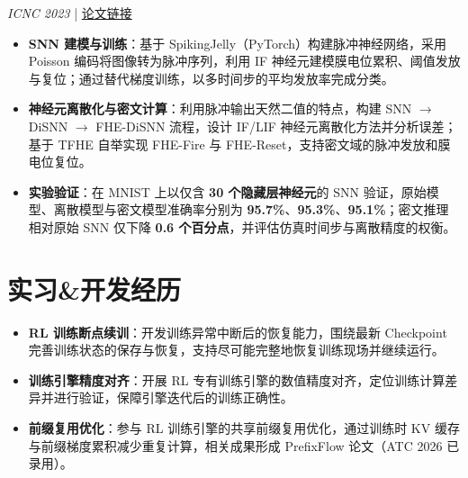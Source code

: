 \documentclass{resume}
\begin{document}
\textit{ICNC 2023} \quad | \quad \href{https://doi.org/10.1109/ICNC59488.2023.10462898}{论文链接}
\begin{itemize}[parsep=0.3ex]
  \item \textbf{SNN 建模与训练}：基于 SpikingJelly（PyTorch）构建脉冲神经网络，采用 Poisson 编码将图像转为脉冲序列，利用 IF 神经元建模膜电位累积、阈值发放与复位；通过替代梯度训练，以多时间步的平均发放率完成分类。
  \item \textbf{神经元离散化与密文计算}：利用脉冲输出天然二值的特点，构建 SNN $\rightarrow$ DiSNN $\rightarrow$ FHE-DiSNN 流程，设计 IF/LIF 神经元离散化方法并分析误差；基于 TFHE 自举实现 FHE-Fire 与 FHE-Reset，支持密文域的脉冲发放和膜电位复位。
  \item \textbf{实验验证}：在 MNIST 上以仅含 \textbf{30 个隐藏层神经元}的 SNN 验证，原始模型、离散模型与密文模型准确率分别为 \textbf{95.7\%}、\textbf{95.3\%}、\textbf{95.1\%}；密文推理相对原始 SNN 仅下降 \textbf{0.6 个百分点}，并评估仿真时间步与离散精度的权衡。
\end{itemize}

\newpage
\section{实习\&开发经历}
\vspace{0.08cm}

\begin{itemize}[parsep=0.3ex]
  \item \textbf{RL 训练断点续训}：开发训练异常中断后的恢复能力，围绕最新 Checkpoint 完善训练状态的保存与恢复，支持尽可能完整地恢复训练现场并继续运行。
  \item \textbf{训练引擎精度对齐}：开展 RL 专有训练引擎的数值精度对齐，定位训练计算差异并进行验证，保障引擎迭代后的训练正确性。
  \item \textbf{前缀复用优化}：参与 RL 训练引擎的共享前缀复用优化，通过训练时 KV 缓存与前缀梯度累积减少重复计算，相关成果形成 PrefixFlow 论文（ATC 2026 已录用）。
\end{itemize}
\vspace{0.1cm}
\end{document}
